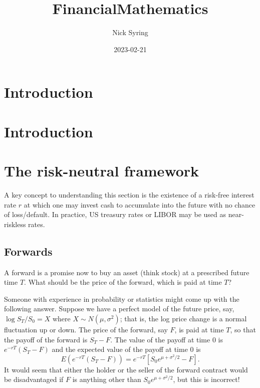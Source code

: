 \documentclass[
]{book}
\title{FinancialMathematics}
\author{Nick Syring}
\date{2023-02-21}
\begin{document}
\maketitle

{
\setcounter{tocdepth}{1}
\tableofcontents
}
\hypertarget{introduction}{%
\chapter{Introduction}\label{introduction}}

\hypertarget{intro}{%
\chapter{Introduction}\label{intro}}

\hypertarget{the-risk-neutral-framework}{%
\chapter{The risk-neutral framework}\label{the-risk-neutral-framework}}

A key concept to understanding this section is the existence of a risk-free interest rate \(r\) at which one may invest cash to accumulate into the future with no chance of loss/default. In practice, US treasury rates or LIBOR may be used as near-riskless rates.

\hypertarget{forwards}{%
\section{Forwards}\label{forwards}}

A forward is a promise now to buy an asset (think stock) at a prescribed future time \(T\). What should be the price of the forward, which is paid at time \(T\)?

Someone with experience in probability or statistics might come up with the following answer. Suppose we have a perfect model of the future price, say, \(\log S_T/S_0 = X\) where \(X\sim N(\mu, \sigma^2)\); that is, the log price change is a normal fluctuation up or down. The price of the forward, say \(F\), is paid at time \(T\), so that the payoff of the forward is \(S_T - F\). The value of the payoff at time \(0\) is \(e^{-rT}(S_T - F)\) and the expected value of the payoff at time \(0\) is
\[E(e^{-rT}(S_T - F)) = e^{-rT}\left[S_0e^{\mu + \sigma^2/2}-F\right].\]
It would seem that either the holder or the seller of the forward contract would be disadvantaged if \(F\) is anything other than \(S_0e^{\mu + \sigma^2/2}\), but this is incorrect!
\end{document}
